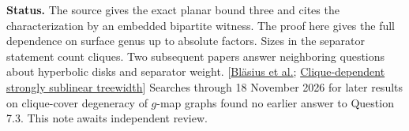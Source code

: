 \documentclass[11pt]{article}
\begin{document}
\small
\textbf{Status.} The source gives the exact planar bound three and cites the characterization by an embedded bipartite witness. The proof here gives the full dependence on surface genus up to absolute factors. Sizes in the separator statement count cliques. Two subsequent papers answer neighboring questions about hyperbolic disks and separator weight. [\href{https://arxiv.org/abs/2603.18997}{Bläsius et al.}; \href{https://arxiv.org/abs/2609.24684}{Clique-dependent strongly sublinear treewidth}] Searches through 18 November 2026 for later results on clique-cover degeneracy of $g$-map graphs found no earlier answer to Question 7.3. This note awaits independent review.
\end{document}
